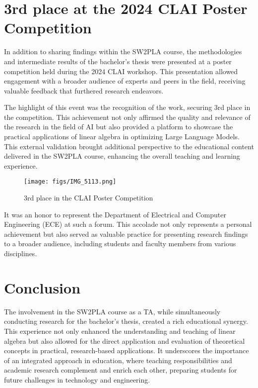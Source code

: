 \section*{3rd place at the 2024 CLAI Poster Competition}
In addition to sharing findings within the SW2PLA course, the methodologies and intermediate results of the bachelor's thesis were presented at a poster competition held during the 2024 CLAI workshop. This presentation allowed engagement with a broader audience of experts and peers in the field, receiving valuable feedback that furthered research endeavors.

The highlight of this event was the recognition of the work, securing 3rd place in the competition. This achievement not only affirmed the quality and relevance of the research in the field of AI but also provided a platform to showcase the practical applications of linear algebra in optimizing Large Language Models. This external validation brought additional perspective to the educational content delivered in the SW2PLA course, enhancing the overall teaching and learning experience.

\begin{figure}[H]
    \centering
    \texttt{[image: figs/IMG\_5113.png]}
    \caption{3rd place in the CLAI Poster Competition}
    \label{fig:CLAI_Poster_Competition}
\end{figure}
It was an honor to represent the Department of Electrical and Computer Engineering (ECE) at such a forum. This accolade not only represents a personal achievement but also served as valuable practice for presenting research findings to a broader audience, including students and faculty members from various disciplines.

\section*{Conclusion}

The involvement in the SW2PLA course as a TA, while simultaneously conducting research for the bachelor's thesis, created a rich educational synergy. This experience not only enhanced the understanding and teaching of linear algebra but also allowed for the direct application and evaluation of theoretical concepts in practical, research-based applications. It underscores the importance of an integrated approach in education, where teaching responsibilities and academic research complement and enrich each other, preparing students for future challenges in technology and engineering.
